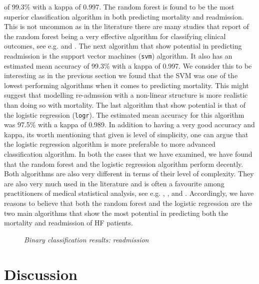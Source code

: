 \documentclass[../thesis.tex]{subfiles}
\begin{document}
\noindent of 99.3\% with a kappa of 0.997. The random forest is found to be the most superior classification algorithm in both predicting mortality and readmission. This is not uncommon as in the literature there are many studies that report of the random forest being a very effective algorithm for classifying clinical outcomes, see e.g. \cite{austin2013using} and \cite{zolfaghar2013big}. The next algorithm that show potential in predicting readmission is the support vector machines (\texttt{svm}) algorithm. It also has an estimated mean accuracy of 99.3\% with a kappa of 0.997. We consider this to be interesting as in the previous section we found that the SVM was one of the lowest performing algorithms when it comes to predicting mortality. This might suggest that modelling re-admssion with a non-linear structure is more realistic than doing so with mortality. The last algorithm that show potential is that of the logistic regression (\texttt{logr}). The estimated mean accuracy for this algorithm was 97.5\% with a kappa of 0.989. In addition to having a very good accuracy and kappa, its worth mentioning that given is level of simplicity, one can argue that the logistic regression algorithm is more preferable to more advanced classification algorithm. In both the cases that we have examined, we have found that the random forest and the logistic regression algorithm perform decently. Both algorithms are also very different in terms of their level of complexity. They are also very much used in the literature and is often a favourite among practitioners of medical statistical analysis, see e.g. \cite{austin2013using}, \cite{zolfaghar2013big}, \cite{shah2014phenomapping} and \cite{panahiazar2015using}. Accordingly, we have reasons to believe that both the random forest and the logistic regression are the two main algorithms that show the most potential in predicting both the mortality and readmission of HF patients.

\begin{figure}[th!]
    \centering
    \scalebox{.8}{}
    \caption[Binary classification results: readmission]{\textit{Binary classification results: readmission}}
    \label{fig:bi_class_read}
\end{figure}

\section{Discussion}
\end{document}
